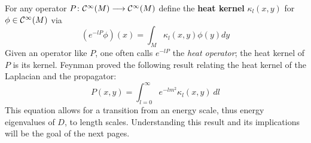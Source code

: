 For any operator $P \colon \mathcal{C}^{\infty}(M) \longrightarrow \mathcal{C}^{\infty}(M)$ define the \textbf{heat kernel} $\kappa_l (x,y)$ for $\phi \in \Ci(M)$ via
\begin{equation}
  (e^{-l P} \phi)(x) = \int_M \kappa_l(x,y) \phi(y) dy
\end{equation}
Given an operator like $P$, one often calls $e^{-l P}$ the \emph{heat operator}; the heat kernel of $P$ is its kernel. Feynman proved the following result relating the heat kernel of the Laplacian and the propagator:
\begin{equation}
  P(x,y) = \int_{l = 0}^{\infty} e^{- l m^2} \kappa_l (x,y) \ dl
\end{equation}
This equation allows for a transition from an energy scale, thus energy eigenvalues of $D$, to length scales. Understanding this result and its implications will be the goal of the next pages.\\

